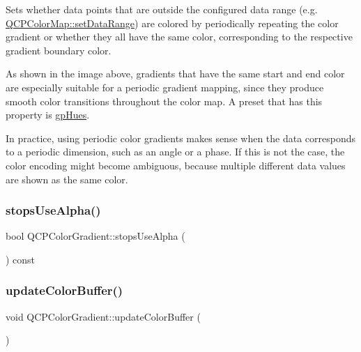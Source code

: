 Sets whether data points that are outside the configured data range (e.\+g. \mbox{\hyperlink{class_q_c_p_color_map_a980b42837821159786a85b4b7dcb8774}{Q\+C\+P\+Color\+Map\+::set\+Data\+Range}}) are colored by periodically repeating the color gradient or whether they all have the same color, corresponding to the respective gradient boundary color.



As shown in the image above, gradients that have the same start and end color are especially suitable for a periodic gradient mapping, since they produce smooth color transitions throughout the color map. A preset that has this property is \mbox{\hyperlink{class_q_c_p_color_gradient_aed6569828fee337023670272910c9072a30efe58407acfb67939032f70213a130}{gp\+Hues}}.

In practice, using periodic color gradients makes sense when the data corresponds to a periodic dimension, such as an angle or a phase. If this is not the case, the color encoding might become ambiguous, because multiple different data values are shown as the same color. \mbox{\label{class_q_c_p_color_gradient_a137b368ea8829a871974add6e4883c71}} 
\subsubsection{\texorpdfstring{stopsUseAlpha()}{stopsUseAlpha()}}
{\footnotesize\ttfamily bool Q\+C\+P\+Color\+Gradient\+::stops\+Use\+Alpha (\begin{DoxyParamCaption}{ }\end{DoxyParamCaption}) const\hspace{0.3cm}{\ttfamily [protected]}}

\mbox{\label{class_q_c_p_color_gradient_a353f15ab3ab586eebf1f6b58c3e2707b}} 
\subsubsection{\texorpdfstring{updateColorBuffer()}{updateColorBuffer()}}
{\footnotesize\ttfamily void Q\+C\+P\+Color\+Gradient\+::update\+Color\+Buffer (\begin{DoxyParamCaption}{ }\end{DoxyParamCaption})\hspace{0.3cm}{\ttfamily [protected]}}




